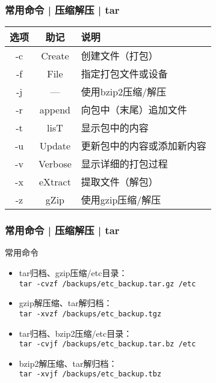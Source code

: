\begin{frame}
  \frametitle{常用命令 | 压缩解压 | \alert{tar}}
  \begin{table}
    \centering
    \begin{tabularx}{0.9\textwidth}{ccX}
      \hline
      \rowcolor{blue!50}选项 & 助记 & 说明\\
      \hline
      -c & Create & 创建文件（打包）\\
      -f & File & 指定打包文件或设备\\
      -j & --- & 使用bzip2压缩/解压\\
      -r & append & 向包中（末尾）追加文件\\
      -t & lisT & 显示包中的内容\\
      -u & Update & 更新包中的内容或添加新内容\\
      -v & Verbose & 显示详细的打包过程\\
      -x & eXtract & 提取文件（解包）\\
      -z & gZip & 使用gzip压缩/解压\\
      \hline
    \end{tabularx}
  \end{table}
\end{frame}

\begin{frame}[fragile]
  \frametitle{常用命令 | 压缩解压 | \alert{tar}}
  \begin{block}{常用命令}
    \begin{itemize}
      \item tar归档、gzip压缩/etc目录：\\ \verb|tar -cvzf /backups/etc_backup.tar.gz /etc|
      \item gzip解压缩、tar解归档：\\ \verb|tar -xvzf /backups/etc_backup.tgz|
      \item tar归档、bzip2压缩/etc目录：\\ \verb|tar -cvjf /backups/etc_backup.tar.bz /etc|
      \item bzip2解压缩、tar解归档：\\ \verb|tar -xvjf /backups/etc_backup.tbz|
    \end{itemize}
  \end{block}
\end{frame}

